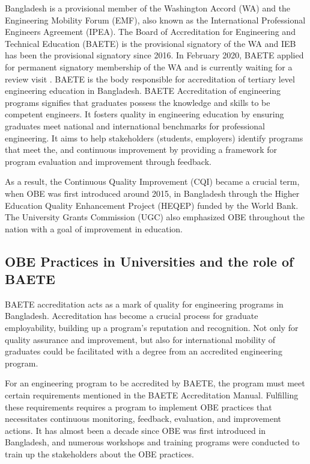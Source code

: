 \documentclass[journal,onecolumn]{IEEEtran}
\begin{document}
Bangladesh is a provisional member of the Washington Accord (WA) and the Engineering Mobility Forum (EMF), also known as the International Professional Engineers Agreement (IPEA). The Board of Accreditation for Engineering and Technical Education (BAETE) is the provisional signatory of the WA and IEB has been the provisional signatory since 2016. In February 2020, BAETE applied for permanent signatory membership of the WA and is currently waiting for a review visit \cite{noauthor_baete_nodate}. BAETE is the body responsible for accreditation of tertiary level engineering education in Bangladesh. BAETE Accreditation of engineering programs signifies that graduates possess the knowledge and skills to be competent engineers. It fosters quality in engineering education by ensuring graduates meet national and international benchmarks for professional engineering. It aims to help stakeholders (students, employers) identify programs that meet the, and continuous improvement by providing a framework for program evaluation and improvement through feedback.

\vspace{6pt}
As a result, the Continuous Quality Improvement (CQI) became a crucial term, when OBE was first introduced around 2015, in Bangladesh through the Higher Education Quality Enhancement Project (HEQEP) funded by the World Bank. The University Grants Commission (UGC) also emphasized OBE throughout the nation with a goal of improvement in education. 

\subsection{OBE Practices in Universities and the role of BAETE}
BAETE accreditation acts as a mark of quality for engineering programs in Bangladesh. Accreditation has become a crucial process for graduate employability, building up a program's reputation and recognition. Not only for quality assurance and improvement, but also for international mobility of graduates could be facilitated with a degree from an accredited engineering program. 
\vspace{6pt}


For an engineering program to be accredited by BAETE, the program must meet certain requirements mentioned in the BAETE Accreditation Manual. Fulfilling these requirements requires a program to implement OBE practices that necessitates continuous monitoring, feedback, evaluation, and improvement actions. It has almost been a decade since OBE was first introduced in Bangladesh, and numerous workshops and training programs were conducted to train up the stakeholders about the OBE practices. 
\vspace{6pt}
\end{document}
